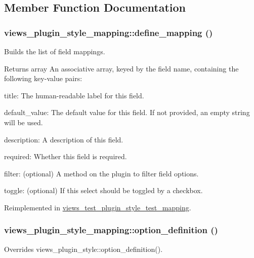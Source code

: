 \subsection{Member Function Documentation}
\hypertarget{classviews__plugin__style__mapping_a283619a0ae0e76eefd0b0189126a17ed}{
\subsubsection[{define\_\-mapping}]{\setlength{\rightskip}{0pt plus 5cm}views\_\-plugin\_\-style\_\-mapping::define\_\-mapping ()}}
\label{classviews__plugin__style__mapping_a283619a0ae0e76eefd0b0189126a17ed}
Builds the list of field mappings.

\begin{DoxyReturn}{Returns}
array An associative array, keyed by the field name, containing the following key-\/value pairs:
\begin{DoxyItemize}
\item title: The human-\/readable label for this field.
\item default\_\-value: The default value for this field. If not provided, an empty string will be used.
\item description: A description of this field.
\item required: Whether this field is required.
\item filter: (optional) A method on the plugin to filter field options.
\item toggle: (optional) If this select should be toggled by a checkbox. 
\end{DoxyItemize}
\end{DoxyReturn}


Reimplemented in \hyperlink{classviews__test__plugin__style__test__mapping_a40be2a1b82e66c70464a489a15a56e1a}{views\_\-test\_\-plugin\_\-style\_\-test\_\-mapping}.\hypertarget{classviews__plugin__style__mapping_a3d8899494e2bbb4899002d528594e3d9}{
\subsubsection[{option\_\-definition}]{\setlength{\rightskip}{0pt plus 5cm}views\_\-plugin\_\-style\_\-mapping::option\_\-definition ()}}
\label{classviews__plugin__style__mapping_a3d8899494e2bbb4899002d528594e3d9}
Overrides views\_\-plugin\_\-style::option\_\-definition(). 

